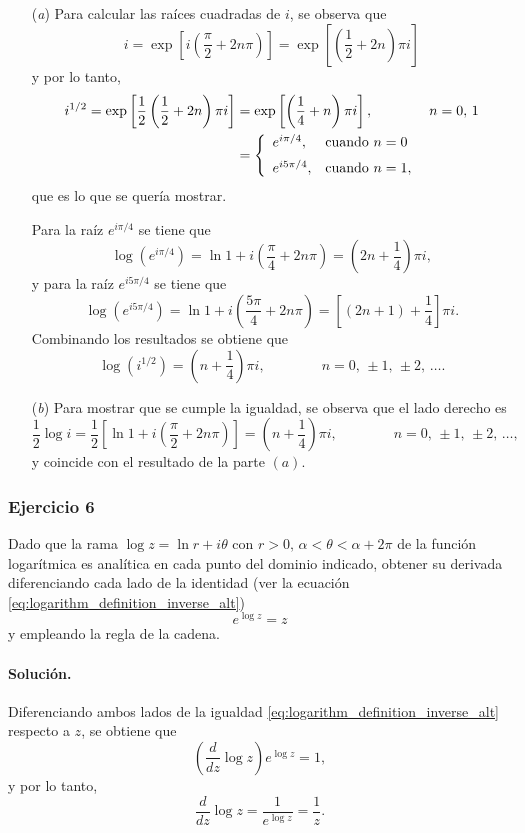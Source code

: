 \documentclass[a4paper]{report}
\begin{document}
\begin{enumerate}
 \item[(\textit{a})] Para calcular las raíces cuadradas de \(i\), se observa que 
 \[
  i=\exp\left[i\left(\frac{\pi}{2}+2n\pi\right)\right]=\exp\left[\left(\frac{1}{2}+2n\right)\pi i\right]
 \]
 y por lo tanto,
 \begin{align*}
  i^{1/2}=\exp\left[\frac{1}{2}\left(\frac{1}{2}+2n\right)\pi i\right]
   &=\exp\left[\left(\frac{1}{4}+n\right)\pi i\right],
   \qquad\qquad n=0,\,1\\
   &=\left\{ 
   \begin{array}{ll}
    e^{i\pi/4}, &\textrm{cuando }n=0\\[\medskipamount]
    e^{i5\pi/4}, &\textrm{cuando }n=1,
   \end{array}
   \right.
 \end{align*}
 que es lo que se quería mostrar.
 
 Para la raíz \(e^{i\pi/4}\) se tiene que 
 \[
  \log(e^{i\pi/4})=\ln1+i\left(\frac{\pi}{4}+2n\pi\right)=\left(2n+\frac{1}{4}\right)\pi i,
 \]
 y para la raíz \(e^{i5\pi/4}\) se tiene que 
 \[
  \log(e^{i5\pi/4})=\ln1+i\left(\frac{5\pi}{4}+2n\pi\right)=\left[(2n+1)+\frac{1}{4}\right]\pi i.
 \]
 Combinando los resultados se obtiene que  
 \[
  \log(i^{1/2})=\left(n+\frac{1}{4}\right)\pi i,\qquad\qquad n=0,\,\pm1,\,\pm2,\,\dots.
 \]
 \item[(\textit{b})] Para mostrar que se cumple la igualdad, se observa que el lado derecho es
 \[
  \frac{1}{2}\log i=\frac{1}{2}\left[\ln1+i\left(\frac{\pi}{2}+2n\pi\right)\right]
  =\left(n+\frac{1}{4}\right)\pi i,\qquad\qquad n=0,\,\pm1,\,\pm2,\,\dots,
 \]
 y coincide con el resultado de la parte \((a)\).
\end{enumerate}

\subsubsection{Ejercicio 6}

Dado que la rama \(\log z=\ln r+i\theta\) con \(r>0,\,\alpha<\theta<\alpha+2\pi\) de la función logarítmica es analítica en cada punto del dominio indicado, obtener su derivada diferenciando cada lado de la identidad (ver la ecuación \ref{eq:logarithm_definition_inverse_alt})
\[
 e^{\log z}=z
\]
y empleando la regla de la cadena.

\paragraph{Solución.} Diferenciando ambos lados de la igualdad  \ref{eq:logarithm_definition_inverse_alt} respecto a \(z\), se obtiene que 
\[
 \left(\frac{d}{dz}\log z\right)e^{\log z}=1,
\]
y por lo tanto,
\[
 \frac{d}{dz}\log z=\frac{1}{e^{\log z}}=\frac{1}{z}.
\]
\end{document}
